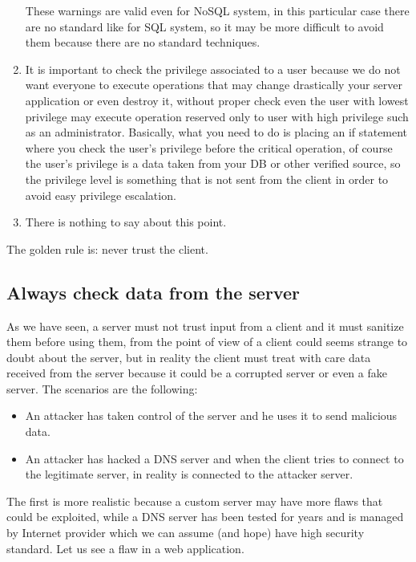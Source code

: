 \begin{enumerate}
	These warnings are valid even for NoSQL system, in this particular case there are no standard like for SQL system, so it may be more difficult to avoid them because there are no standard techniques.
	\item It is important to check the privilege associated to a user because we do not want everyone to execute operations that may change drastically your server application or even destroy it, without proper check even the user with lowest privilege may execute operation reserved only to user with high privilege such as an administrator.
	Basically, what you need to do is placing an if statement where you check the user’s privilege before the critical operation, of course the user’s privilege is a data taken from your DB or other verified source, so the privilege level is something that is not sent from the client in order to avoid easy privilege escalation.
	\item There is nothing to say about this point.
\end{enumerate}

The golden rule is: never trust the client.

\subsection{Always check data from the server}
As we have seen, a server must not trust input from a client and it must sanitize them before using them, from the point of view of a client could seems strange to doubt about the server, but in reality the client must treat with care data received from the server because it could be a corrupted server or even a fake server.\newline
The scenarios are the following:
\begin{itemize}
	\item An attacker has taken control of the server and he uses it to send malicious data.
	\item An attacker has hacked a DNS server and when the client tries to connect to the legitimate server, in reality is connected to the attacker server.
\end{itemize}

The first is more realistic because a custom server may have more flaws that could be exploited, while a DNS server has been tested for years and is managed by Internet provider which we can assume (and hope) have high security standard.\newline
Let us see a flaw in a web application.

